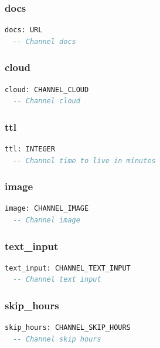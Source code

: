 \subsubsection{docs}

\begin{lstlisting}[language=Eiffel]
docs: URL
  -- Channel docs
\end{lstlisting}

\subsubsection{cloud}

\begin{lstlisting}[language=Eiffel]
cloud: CHANNEL_CLOUD
  -- Channel cloud
\end{lstlisting}

\subsubsection{ttl}

\begin{lstlisting}[language=Eiffel]
ttl: INTEGER
  -- Channel time to live in minutes
\end{lstlisting}

\subsubsection{image}

\begin{lstlisting}[language=Eiffel]
image: CHANNEL_IMAGE
  -- Channel image
\end{lstlisting}

\subsubsection{text\_input}

\begin{lstlisting}[language=Eiffel]
text_input: CHANNEL_TEXT_INPUT
  -- Channel text input
\end{lstlisting}

\subsubsection{skip\_hours}

\begin{lstlisting}[language=Eiffel]
skip_hours: CHANNEL_SKIP_HOURS
  -- Channel skip hours
\end{lstlisting}

